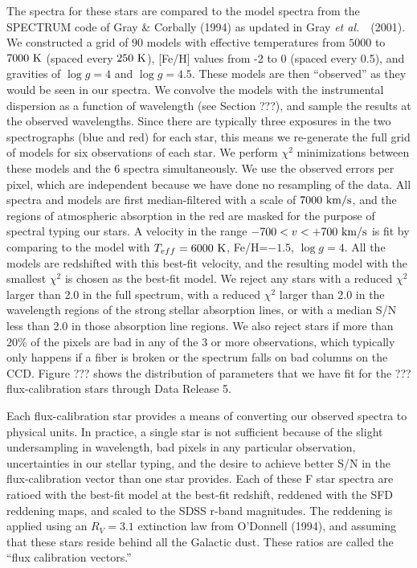 \documentclass[12pt,preprint]{aastex}
\newcommand{\etal}{{\it et al.}~}
\newcommand{\K}{{\rm ~K}}
\newcommand{\kms}{{\rm ~km/s}}
\begin{document}
The spectra for these stars are compared to the model spectra
from the SPECTRUM code of Gray \& Corbally (1994) as updated
in Gray \etal\ (2001).
We constructed a grid of 90 models with effective temperatures
from $5000$ to $7000 \K$ (spaced every $250 \K$), [Fe/H] values
from -2 to 0 (spaced every 0.5), and gravities of $\log g=4$
and $\log g=4.5$.  These models are then ``observed'' as they
would be seen in our spectra.  We convolve the models with
the instrumental dispersion as a function of wavelength
(see Section ???), and sample the results at the observed wavelengths.
Since there are typically three exposures in the two spectrographs
(blue and red) for each star, this means we re-generate the full
grid of models for six observations of each star.
We perform $\chi^2$ minimizations between these models and the
6 spectra simultaneously.  We use the observed errors per pixel,
which are independent because we have done no resampling of the data.
All spectra and models are first median-filtered with a scale of $7000\kms$,
and the regions of atmospheric absorption in the red are masked
for the purpose of spectral typing our stars.
A velocity in the range $-700 < v < +700 \kms$ is fit
by comparing to the model with $T_{eff} = 6000\K$, Fe/H=$-1.5$,
$\log g=4$.  All the models are redshifted with this best-fit velocity,
and the resulting model with the smallest $\chi^2$ is chosen
as the best-fit model.  We reject any stars with a reduced $\chi^2$
larger than 2.0 in the full spectrum, with a reduced $\chi^2$
larger than 2.0 in the wavelength regions of the strong stellar
absorption lines, or with a median S/N less than 2.0 in
those absorption line regions.
We also reject stars if more than $20\%$ of the pixels are bad
in any of the 3 or more observations, which typically only happens
if a fiber is broken or the spectrum falls on bad columns on the CCD.
Figure ??? shows the distribution of parameters that we have fit
for the ??? flux-calibration stars through Data Release 5.

Each flux-calibration star provides a means of converting our
observed spectra to physical units.  
In practice, a single star is not sufficient because of the
slight undersampling in wavelength, bad pixels in any
particular observation, uncertainties in our stellar typing,
and the desire to achieve better S/N in the flux-calibration
vector than one star provides.  Each of these F star spectra
are ratioed with the best-fit model at the best-fit redshift,
reddened with the SFD reddening maps, and scaled to the SDSS r-band
magnitudes.  The reddening is applied using an $R_V=3.1$ extinction
law from O'Donnell (1994), and assuming that these stars reside
behind all the Galactic dust.
These ratios are called the ``flux calibration vectors.''
\end{document}
